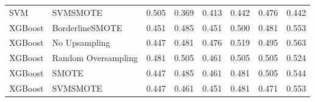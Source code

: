 \begin{tabular}{llllllll}
                            SVM &                      SVMSMOTE & 0.505 &                     0.369 &                 0.413 &                  0.442 &                                   0.476 &     0.442 \\
                        XGBoost &               BorderlineSMOTE & 0.451 &                     0.485 &                 0.451 &                  0.500 &                                   0.481 &     0.553 \\
                        XGBoost &                 No Upsampling & 0.447 &                     0.481 &                 0.476 &                  0.519 &                                   0.495 &     0.563 \\
                        XGBoost &           Random Oversampling & 0.481 &                     0.505 &                 0.461 &                  0.505 &                                   0.505 &     0.524 \\
                        XGBoost &                         SMOTE & 0.447 &                     0.485 &                 0.461 &                  0.481 &                                   0.505 &     0.544 \\
                        XGBoost &                      SVMSMOTE & 0.447 &                     0.461 &                 0.451 &                  0.481 &                                   0.471 &     0.553 \\
\bottomrule
\end{tabular}
